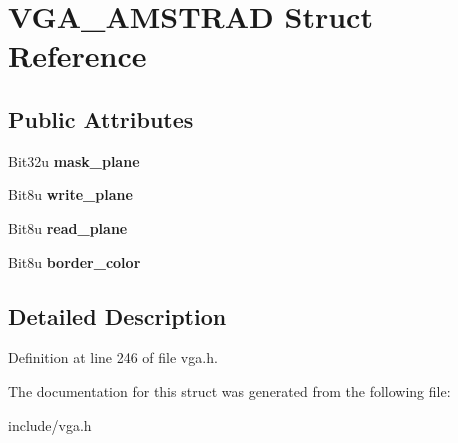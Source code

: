 \hypertarget{structVGA__AMSTRAD}{\section{V\-G\-A\-\_\-\-A\-M\-S\-T\-R\-A\-D Struct Reference}
\label{structVGA__AMSTRAD}
}
\subsection*{Public Attributes}
\begin{DoxyCompactItemize}
\item 
\hypertarget{structVGA__AMSTRAD_a3579c14ec7babb41e253a8310b9a71ed}{Bit32u {\bfseries mask\-\_\-plane}}\label{structVGA__AMSTRAD_a3579c14ec7babb41e253a8310b9a71ed}

\item 
\hypertarget{structVGA__AMSTRAD_a175865e5ad51119933b86b1a81f071dc}{Bit8u {\bfseries write\-\_\-plane}}\label{structVGA__AMSTRAD_a175865e5ad51119933b86b1a81f071dc}

\item 
\hypertarget{structVGA__AMSTRAD_adb93b9bfc436df9b90f1a7bc9d1dcfbe}{Bit8u {\bfseries read\-\_\-plane}}\label{structVGA__AMSTRAD_adb93b9bfc436df9b90f1a7bc9d1dcfbe}

\item 
\hypertarget{structVGA__AMSTRAD_ac7630605b97b058a383b751285e5de6e}{Bit8u {\bfseries border\-\_\-color}}\label{structVGA__AMSTRAD_ac7630605b97b058a383b751285e5de6e}

\end{DoxyCompactItemize}


\subsection{Detailed Description}


Definition at line 246 of file vga.\-h.



The documentation for this struct was generated from the following file\-:\begin{DoxyCompactItemize}
\item 
include/vga.\-h\end{DoxyCompactItemize}
